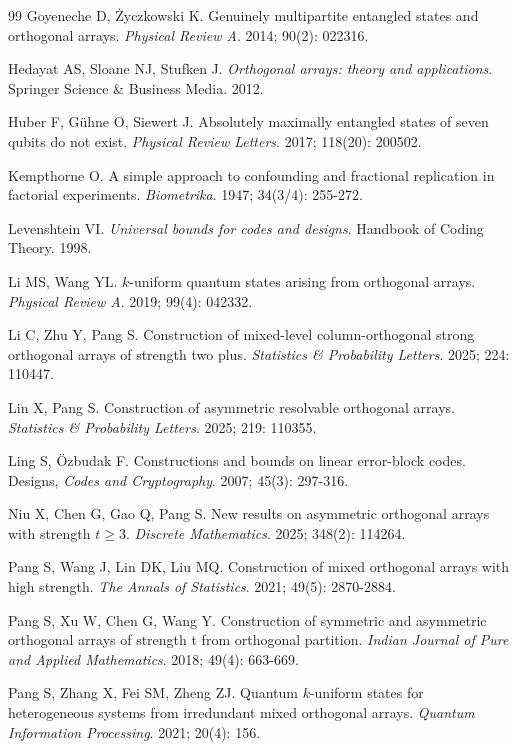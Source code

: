 \documentclass[11pt]{article}
\newtheorem{Definition and Notation}[Theorem]{Definition and Notation}
\begin{document}
\begin{thebibliography}{99}
 Goyeneche D, \.{Z}yczkowski K. Genuinely multipartite entangled states and orthogonal arrays. {\it Physical Review A}. 2014; 90(2): 022316.

 Hedayat AS, Sloane NJ, Stufken J. {\it Orthogonal arrays: theory and applications}. Springer Science \& Business Media. 2012.

 Huber F, G\"uhne O, Siewert J. Absolutely maximally entangled states of seven qubits do not exist. {\it Physical Review Letters}. 2017; 118(20): 200502.

  Kempthorne O. A simple approach to confounding and fractional replication in factorial experiments. {\it Biometrika}. 1947; 34(3/4): 255-272.

 Levenshtein VI. {\it Universal bounds for codes and designs}.  Handbook of Coding Theory. 1998.

 Li MS, Wang YL. $k$-uniform quantum states arising from orthogonal arrays. {\it Physical Review A}. 2019; 99(4): 042332.

 Li C, Zhu Y, Pang S. Construction of mixed-level column-orthogonal strong orthogonal arrays of strength two plus. {\it Statistics \& Probability Letters}. 2025; 224: 110447.

 Lin X, Pang S. Construction of asymmetric resolvable orthogonal arrays. {\it Statistics \& Probability Letters}. 2025; 219: 110355.

  Ling S, \"Ozbudak F. Constructions and bounds on linear error-block codes. Designs, {\it Codes and Cryptography}. 2007; 45(3): 297-316.

 Niu X, Chen G, Gao Q, Pang S. New results on asymmetric orthogonal arrays with strength $t\ge 3$. {\it Discrete Mathematics}. 2025; 348(2): 114264.

 Pang S, Wang J, Lin DK, Liu MQ. Construction of mixed orthogonal arrays with high strength. {\it The Annals of Statistics}. 2021; 49(5): 2870-2884.

 Pang S, Xu W, Chen G, Wang Y. Construction of symmetric and asymmetric orthogonal arrays of strength t from orthogonal partition. {\it Indian Journal of Pure and Applied Mathematics}. 2018; 49(4): 663-669.

 Pang S, Zhang X, Fei SM, Zheng ZJ. Quantum $k$-uniform states for heterogeneous systems from irredundant mixed orthogonal arrays. {\it Quantum Information Processing}. 2021; 20(4): 156.


\end{thebibliography}
\end{document}
